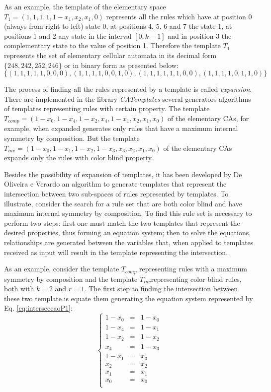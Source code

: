\documentclass{llncs}
\begin{document}
As an example, the template of the elementary space $T_1 = (1,1,1,1,1-x_1,x_2,x_1,0)$ represents all the rules which have at position 0 (always from right to left) state 0, at positions 4, 5, 6 and 7 the state 1, at positions 1 and 2 any state in the interval $ [0, k-1] $ and in position 3 the complementary state to the value of position 1. Therefore the template $T_1$ represents the set of elementary cellular automata in its decimal form $\{248,242,252,246\}$ or in binary form as presented below:
\begin{displaymath}
\{(1,1,1,1,1,0,0,0),(1,1,1,1,0,0,1,0),(1,1,1,1,1,1,0,0),(1,1,1,1,0,1,1,0)\}
\end{displaymath}

The process of finding all the rules represented by a template is called \textit{expansion}. There are implemented in the library \textit{CATemplates} \cite{CATemplates} several generators algorithms of templates representing rules with certain property. %
 The template $T_{comp} = (1 - x_0, 1 - x_4, 1 - x_2, x_4, 1 - x_1, x_2, x_1, x_0)$ of the elementary CAs, for example, when expanded generates only rules that have a maximum internal symmetry by composition. But the template $T_{inv} = (1 - x_0, 1 - x_1, 1 - x_2, 1 - x_3, x_3, x_2, x_1, x_0)$ of the elementary CAs expands only the rules with color blind property.

Besides the possibility of expansion of templates, it has been developed by De Oliveira e Verardo \cite{deOliveira2014b} an algorithm to generate templates that represent the intersection between two sub-spaces of rules represented by templates. To illustrate, consider the search for a rule set that are both color blind and have maximum internal symmetry by composition. To find this rule set is necessary to perform two steps: first one must match the two templates that represent the desired properties, thus forming an equation system; then to solve the equations, relationships are generated between the variables that, when applied to templates received as input will result in the template representing the intersection.

As an example, consider the template $T_{comp}$ representing rules with a maximum symmetry by composition and the template $T_{inv}$representing color blind rules, both with $k=2$ and $r=1$. The first step to finding the intersection between these two template is equate them generating the equation system represented by Eq. \ref{eq:interseccaoP1}:
\begin{equation}
\left\{\begin{matrix}
1 - x_0 & = & 1 - x_0 \\
1 - x_4 & = & 1 - x_1 \\
1 - x_2 & = & 1 - x_2 \\
x_4   & = & 1 - x_3 \\
1 - x_1 & = & x_3   \\
x_2   & = & x_2   \\
x_1   & = & x_1   \\
x_0   & = & x_0   \\
\end{matrix}\right.
\label{eq:interseccaoP1}
\end{equation}
\end{document}
